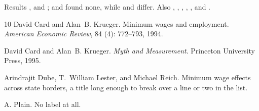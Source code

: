 \documentclass[11pt]{article}
\begin{document}
Results \citep{card1994}, \citep{card1994,card1995a,dube2010} and \citep[see][p.~3]{dube2010}; \citet{card1994}
and \citet{card1994,card1995a} found none, while \citet[ch.~2]{dube2010} and \citet{card1994,dube2010} differ.
Also \citealt{dube2010}, \citealp{dube2010}, \citeauthor{dube2010}, \citeyear{dube2010}, \citeyearpar{dube2010},
\cite{card1994} and \citep{card1994,nokey,plain}.

\begin{thebibliography}{10}
David Card and Alan~B. Krueger.
\newblock Minimum wages and employment.
\newblock \emph{American Economic Review}, 84 (4): 772--793, 1994.

David Card and Alan~B. Krueger.
\newblock \emph{Myth and Measurement}.
\newblock Princeton University Press, 1995{}.

Arindrajit Dube, T.~William Lester, and Michael Reich.
\newblock Minimum wage effects across state borders, a title long enough to break over a line or two in the list.

A. Plain.
\newblock No label at all.
\end{thebibliography}
\end{document}
